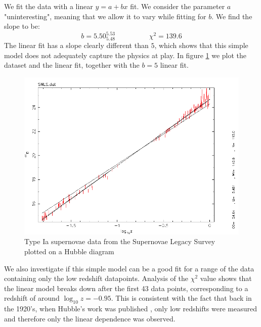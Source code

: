 \documentclass[11pt]{article}
\begin{document}
We fit the data with a linear $y = a + b x$ fit. We consider the parameter $a$ "uninteresting", meaning that we allow it to vary while fitting for $b$. We find the slope to be: 
\begin{equation}
	b = 5.50^{5.53}_{5.48} 
	\hspace{2cm}
	\chi^2 = 139.6
	\label{res:lin}
\end{equation}
The linear fit has a slope clearly different than $5$, which shows that this simple model does not adequately capture the physics at play. In figure \ref{fig:snls} we plot the dataset and the linear fit, together with the $b = 5$ linear fit. 

\begin{figure}[htbp]
	\centering
	\includegraphics[width=0.8\linewidth]{snls.png}
	\caption{Type Ia supernovae data from the Supernovae Legacy Survey plotted on a Hubble diagram}
	\label{fig:snls}
\end{figure}

We also investigate if this simple model can be a good fit for a range of the data containing only the low redshift datapoints. Analysis of the $\chi^2$ value shows that the linear model breaks down after the first 43 data points, corresponding to a redshift of around $\log_{10}z = -0.95$. This is consistent with the fact that back in the 1920's, when Hubble's work was published \cite{Hubble1929}, only low redshifts were measured and therefore only the linear dependence was observed. 
\end{document}
